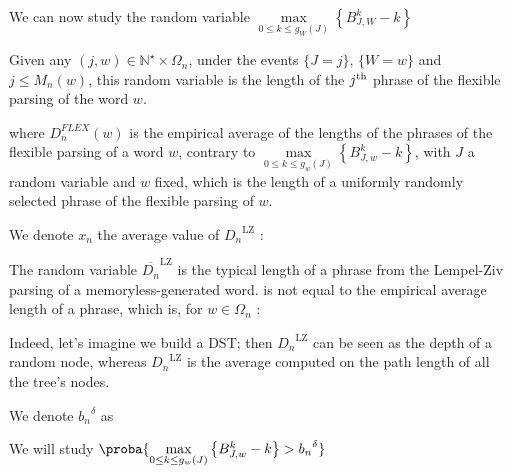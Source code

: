 \noindent
We can now study the random variable
    {$ \underset{ 0 \leq k \leq g_W(J) }{ \max } 
                    \left\{ { B_{J, W}^k - k } \right\} $}

\noindent
Given any $(j,w) \in \mathbb{N}^{\star} \times \Omega_n$,
under the events $\{ J = j \}$, $\{ W = w \}$ and $j \leq M_n(w)$, 
this random variable is the length of 
the $j^{\textmd{th}}$ phrase of the flexible parsing of the word $w$.

\noindent
where $D_n^{FLEX}(w)$ is the empirical average of the lengths of the phrases
of the flexible parsing of a word $w$, contrary to
        $\underset{ 0 \leq k \leq g_w(J) }{ \max } 
        \left\{ { B_{J, w}^k - k } \right\} $,
with $J$ a random variable and $w$ fixed,
which is the length of a uniformly randomly selected 
phrase of the flexible parsing of $w$. 

\begin{df}
    We denote $x_n$ the average value of ${D_n}^{\text{LZ}}$ :
\end{df}

\begin{rmk}
    The random variable $\overline{D_n}^{\text{LZ}}$ is the
    typical length of a phrase from the Lempel-Ziv parsing 
    of a memoryless-generated word. is not equal
    to the empirical average length of a phrase, which is,
    for $w \in \Omega_n$ :

    \noindent
    Indeed, let's imagine we build a DST; then ${D_n}^{\text{LZ}}$
    can be seen as the depth of a random node, whereas 
    ${D_n}^{\text{LZ}}$ is the average computed on the path
    length of all the tree's nodes.
\end{rmk}

\begin{nota}
    We denote ${b_n}^{\delta}$ as
\end{nota}

\noindent
We will study
    \centers
    {$ \proba{ 
        \underset{ 0 \leq k \leq g_w(J) }{ \max } 
        \left\{ { B_{J, w}^k - k } \right\}
            > {b_n}^{\delta} } $}